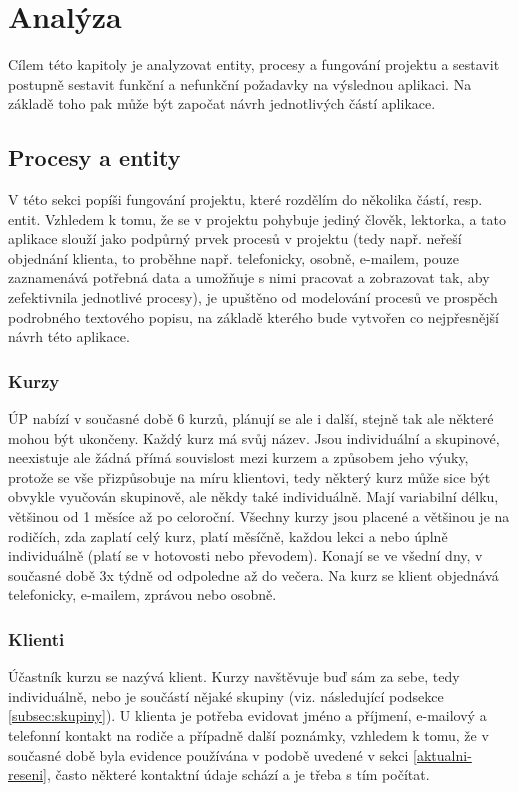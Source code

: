 \chapter{Analýza}
Cílem této kapitoly je analyzovat entity, procesy a fungování projektu a sestavit postupně sestavit funkční a nefunkční požadavky na výslednou aplikaci. Na základě toho pak může být započat návrh jednotlivých částí aplikace.
    
    \section{Procesy a entity}
    V této sekci popíši fungování projektu, které rozdělím do několika částí, resp. entit. Vzhledem k tomu, že se v projektu pohybuje jediný člověk, lektorka, a tato aplikace slouží jako podpůrný prvek procesů v projektu (tedy např. neřeší objednání klienta, to proběhne např. telefonicky, osobně, e-mailem, pouze zaznamenává potřebná data a umožňuje s nimi pracovat a zobrazovat tak, aby zefektivnila jednotlivé procesy), je upuštěno od modelování procesů ve prospěch podrobného textového popisu, na základě kterého bude vytvořen co nejpřesnější návrh této aplikace.
    
        \subsection{Kurzy}\label{subsec:kurzy}
        ÚP nabízí v současné době 6 kurzů, plánují se ale i další, stejně tak ale některé mohou být ukončeny. Každý kurz má svůj název. Jsou individuální a skupinové, neexistuje ale žádná přímá souvislost mezi kurzem a způsobem jeho výuky, protože se vše přizpůsobuje na míru klientovi, tedy některý kurz může sice být obvykle vyučován skupinově, ale někdy také individuálně. Mají variabilní délku, většinou od 1 měsíce až po celoroční. Všechny kurzy jsou placené a většinou je na rodičích, zda zaplatí celý kurz, platí měsíčně, každou lekci a nebo úplně individuálně (platí se v hotovosti nebo převodem). Konají se ve všední dny, v současné době 3x týdně od odpoledne až do večera. Na kurz se klient objednává telefonicky, e-mailem, zprávou nebo osobně.
        
        \subsection{Klienti}\label{subsec:klienti}
        Účastník kurzu se nazývá klient. Kurzy navštěvuje buď sám za sebe, tedy individuálně, nebo je součástí nějaké skupiny (viz. následující podsekce \ref{subsec:skupiny}). U klienta je potřeba evidovat jméno a příjmení, e-mailový a telefonní kontakt na rodiče a případně další poznámky, vzhledem k tomu, že v současné době byla evidence používána v podobě uvedené v sekci \ref{aktualni-reseni}, často některé kontaktní údaje schází a je třeba s tím počítat.
        
